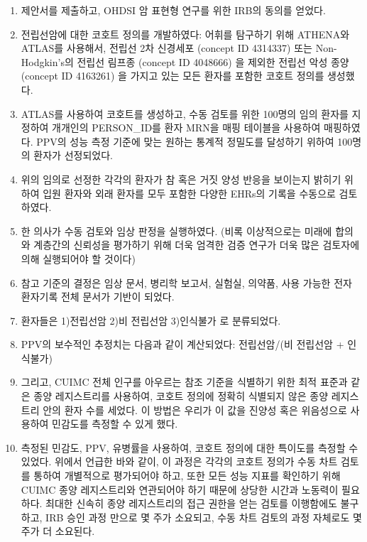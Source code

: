 \documentclass[10.5pt]{book}
\providecommand{\tightlist}{%
  \setlength{\itemsep}{0pt}\setlength{\parskip}{0pt}}
\theoremstyle{definition}
\theoremstyle{definition}
\theoremstyle{definition}
\theoremstyle{remark}
\begin{document}
\begin{enumerate}
\def\labelenumi{\arabic{enumi}.}
\tightlist
\item
  제안서를 제출하고, OHDSI 암 표현형 연구를 위한 IRB의 동의를 얻었다.
\item
  전립선암에 대한 코호트 정의를 개발하였다: 어휘를 탐구하기 위해
  ATHENA와 ATLAS를 사용해서, 전립선 2차 신경세포 (concept ID 4314337)
  또는 Non-Hodgkin's의 전립선 림프종 (concept ID 4048666) 을 제외한
  전립선 악성 종양 (concept ID 4163261) 을 가지고 있는 모든 환자를
  포함한 코호트 정의를 생성했다.
\item
  ATLAS를 사용하여 코호트를 생성하고, 수동 검토를 위한 100명의 임의
  환자를 지정하여 개개인의 PERSON\_ID를 환자 MRN을 매핑 테이블을
  사용하여 매핑하였다. PPV의 성능 측정 기준에 맞는 원하는 통계적
  정밀도를 달성하기 위하여 100명의 환자가 선정되었다.
\item
  위의 임의로 선정한 각각의 환자가 참 혹은 거짓 양성 반응을 보이는지
  밝히기 위하여 입원 환자와 외래 환자를 모두 포함한 다양한 EHRs의 기록을
  수동으로 검토하였다.
\item
  한 의사가 수동 검토와 임상 판정을 실행하였다. (비록 이상적으로는
  미래에 합의와 계층간의 신뢰성을 평가하기 위해 더욱 엄격한 검증 연구가
  더욱 많은 검토자에 의해 실행되어야 할 것이다)
\item
  참고 기준의 결정은 임상 문서, 병리학 보고서, 실험실, 의약품, 사용
  가능한 전자 환자기록 전체 문서가 기반이 되었다.
\item
  환자들은 1)전립선암 2)비 전립선암 3)인식불가 로 분류되었다.
\item
  PPV의 보수적인 추정치는 다음과 같이 계산되었다: 전립선암/(비 전립선암
  + 인식불가)
\item
  그리고, CUIMC 전체 인구를 아우르는 참조 기준을 식별하기 위한 최적
  표준과 같은 종양 레지스트리를 사용하여, 코호트 정의에 정확히 식별되지
  않은 종양 레지스트리 안의 환자 수를 세었다. 이 방법은 우리가 이 값을
  진양성 혹은 위음성으로 사용하여 민감도를 측정할 수 있게 했다.
\item
  측정된 민감도, PPV, 유병률을 사용하여, 코호트 정의에 대한 특이도를
  측정할 수 있었다. 위에서 언급한 바와 같이, 이 과정은 각각의 코호트
  정의가 수동 차트 검토를 통하여 개별적으로 평가되어야 하고, 또한 모든
  성능 지표를 확인하기 위해 CUIMC 종양 레지스트리와 연관되어야 하기
  때문에 상당한 시간과 노동력이 필요하다. 최대한 신속히 종양
  레지스트리의 접근 권한을 얻는 검토를 이행함에도 불구하고, IRB 승인
  과정 만으로 몇 주가 소요되고, 수동 차트 검토의 과정 자체로도 몇 주가
  더 소요된다.
\end{enumerate}
\end{document}
